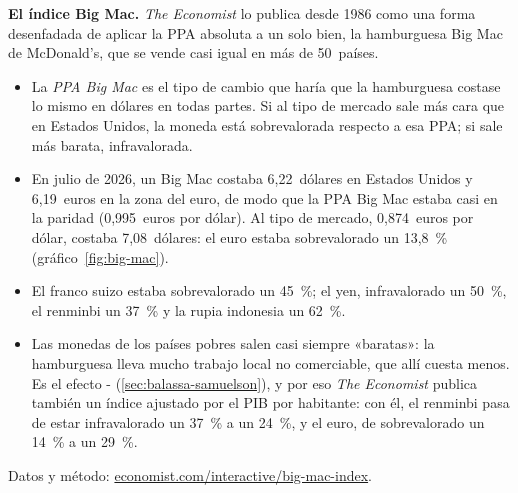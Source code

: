 \documentclass[11pt]{article}
\begin{document}
\begin{anotaciones}
\textbf{El índice Big Mac.} \emph{The Economist} lo publica desde 1986 como una forma desenfadada de aplicar la PPA absoluta a un solo bien, la hamburguesa Big Mac de McDonald's, que se vende casi igual en más de 50~países.
\begin{itemize}
\item La \emph{PPA Big Mac} es el tipo de cambio que haría que la hamburguesa costase lo mismo en dólares en todas partes. Si al tipo de mercado sale más cara que en Estados Unidos, la moneda está sobrevalorada respecto a esa PPA; si sale más barata, infravalorada.
\item En julio de 2026, un Big Mac costaba 6,22~dólares en Estados Unidos y 6,19~euros en la zona del euro, de modo que la PPA Big Mac estaba casi en la paridad (0,995~euros por dólar). Al tipo de mercado, 0,874~euros por dólar, costaba 7,08~dólares: el euro estaba sobrevalorado un 13,8~\%\nocite{Economist2026BigMacDatos} (gráfico~\ref{fig:big-mac}).
\item El franco suizo estaba sobrevalorado un 45~\%; el yen, infravalorado un 50~\%, el renminbi un 37~\% y la rupia indonesia un 62~\%.
\item Las monedas de los países pobres salen casi siempre «baratas»: la hamburguesa lleva mucho trabajo local no comerciable, que allí cuesta menos. Es el efecto - (\ref{sec:balassa-samuelson}), y por eso \emph{The Economist} publica también un índice ajustado por el PIB por habitante: con él, el renminbi pasa de estar infravalorado un 37~\% a un 24~\%, y el euro, de sobrevalorado un 14~\% a un 29~\%.
\end{itemize}
\begin{figuracaja}
\caption{El índice Big Mac, julio de 2026: desviación del tipo de cambio de mercado respecto a la PPA Big Mac frente al dólar (\%; positivo, moneda sobrevalorada)}\label{fig:big-mac}
\end{figuracaja}
Datos y método: \href{https://www.economist.com/interactive/big-mac-index}{economist.com/interactive/big-mac-index}\nocite{Economist2026BigMac}.
\end{anotaciones}
\end{document}
